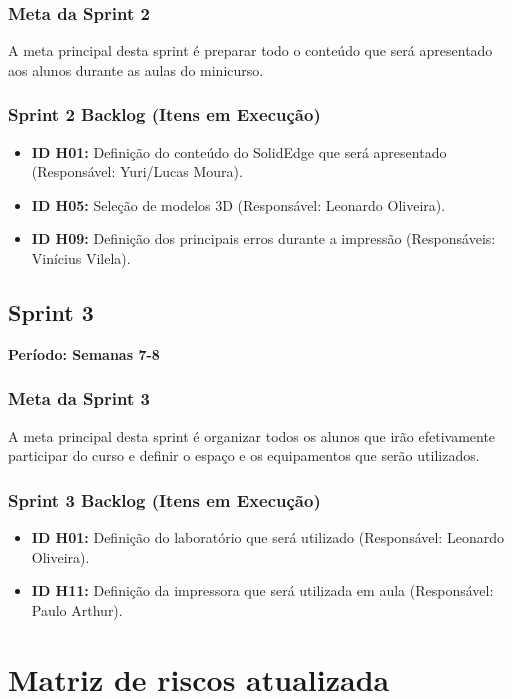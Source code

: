 \documentclass[12pt, a4paper]{article}
\begin{document}
\subsubsection{Meta da Sprint 2}
A meta principal desta sprint é preparar todo o conteúdo que será apresentado aos alunos durante as aulas do minicurso.

\subsubsection{Sprint 2 Backlog (Itens em Execução)}
\begin{itemize}
    \item \textbf{ID H01:} Definição do conteúdo do SolidEdge que será apresentado (Responsável: Yuri/Lucas Moura).
    \item \textbf{ID H05:} Seleção de modelos 3D (Responsável: Leonardo Oliveira).
    \item \textbf{ID H09:} Definição dos principais erros durante a impressão (Responsáveis: Vinícius Vilela).
\end{itemize}

\subsection{Sprint 3}
\textbf{Período: Semanas 7-8} \sprintperiodo \\

\subsubsection{Meta da Sprint 3}
A meta principal desta sprint é organizar todos os alunos que irão efetivamente participar do curso e definir o espaço e os equipamentos que serão utilizados.

\subsubsection{Sprint 3 Backlog (Itens em Execução)}
\begin{itemize}
    \item \textbf{ID H01:} Definição do laboratório que será utilizado (Responsável: Leonardo Oliveira).
    \item \textbf{ID H11:} Definição da impressora que será utilizada em aula (Responsável: Paulo Arthur).
\end{itemize}

\section{Matriz de riscos atualizada}
\end{document}
